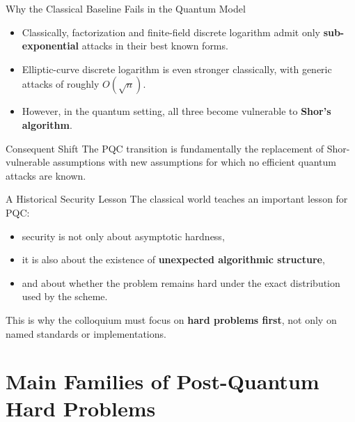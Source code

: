 \documentclass[aspectratio=169]{beamer}
\begin{document}
	\begin{frame}{Why the Classical Baseline Fails in the Quantum Model}
		\begin{itemize}
			\item Classically, factorization and finite-field discrete logarithm admit only \textbf{sub-exponential} attacks in their best known forms.
			\item Elliptic-curve discrete logarithm is even stronger classically, with generic attacks of roughly \textbf{$O(\sqrt{n})$}.
			\item However, in the quantum setting, all three become vulnerable to \textbf{Shor's algorithm}.
		\end{itemize}
		
		\vspace{0.75em}
		\begin{block}{Consequent Shift}
			The PQC transition is fundamentally the replacement of Shor-vulnerable assumptions with new assumptions for which no efficient quantum attacks are known.
		\end{block}
	\end{frame}
	
	\begin{frame}{A Historical Security Lesson}
		The classical world teaches an important lesson for PQC:
		\begin{itemize}
			\item security is not only about asymptotic hardness,
			\item it is also about the existence of \textbf{unexpected algorithmic structure},
			\item and about whether the problem remains hard under the exact distribution used by the scheme.
		\end{itemize}
		
		\vspace{0.5em}
		This is why the colloquium must focus on \textbf{hard problems first}, not only on named standards or implementations.
	\end{frame}
	
	\section{Main Families of Post-Quantum Hard Problems}
	
\end{document}
